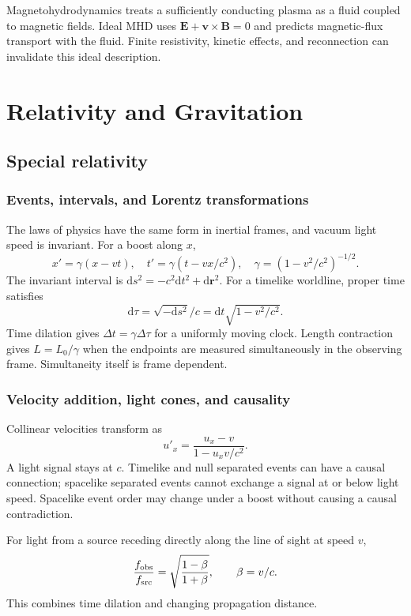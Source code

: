 \documentclass[11pt,oneside]{book}
\newcommand{\dd}{\mathrm{d}}
\newcommand{\vect}[1]{\boldsymbol{#1}}
\theoremstyle{reviewstyle}
\begin{document}
Magnetohydrodynamics treats a sufficiently conducting plasma as a fluid coupled to magnetic fields. Ideal MHD uses $\vect E+\vect v\times\vect B=0$ and predicts magnetic-flux transport with the fluid. Finite resistivity, kinetic effects, and reconnection can invalidate this ideal description.

\part{Relativity and Gravitation}
\chapter{Special relativity}
\section{Events, intervals, and Lorentz transformations}
The laws of physics have the same form in inertial frames, and vacuum light speed is invariant. For a boost along $x$,
\begin{equation}
x'=\gamma(x-vt),\quad t'=\gamma(t-vx/c^2),\quad
\gamma=(1-v^2/c^2)^{-1/2}.
\end{equation}
The invariant interval is $\dd s^2=-c^2\dd t^2+\dd\vect r^2$. For a timelike worldline, proper time satisfies
\begin{equation}\dd\tau=\sqrt{-\dd s^2}/c=\dd t\sqrt{1-v^2/c^2}.\end{equation}
Time dilation gives $\Delta t=\gamma\Delta\tau$ for a uniformly moving clock. Length contraction gives $L=L_0/\gamma$ when the endpoints are measured simultaneously in the observing frame. Simultaneity itself is frame dependent.
\section{Velocity addition, light cones, and causality}
Collinear velocities transform as
\begin{equation}u'_x=\frac{u_x-v}{1-u_xv/c^2}.\end{equation}
A light signal stays at $c$. Timelike and null separated events can have a causal connection; spacelike separated events cannot exchange a signal at or below light speed. Spacelike event order may change under a boost without causing a causal contradiction.

For light from a source receding directly along the line of sight at speed $v$,
\begin{equation}\frac{f_{\rm obs}}{f_{\rm src}}=\sqrt{\frac{1-\beta}{1+\beta}},\qquad \beta=v/c.\end{equation}
This combines time dilation and changing propagation distance.
\end{document}
